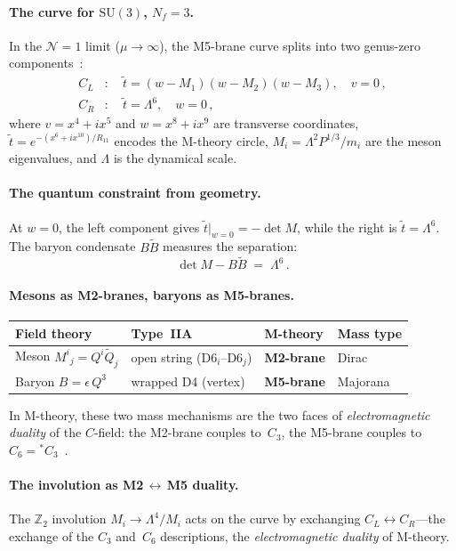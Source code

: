 \documentclass[12pt,a4paper]{article}
\newcommand{\SU}{\mathrm{SU}}
\newcommand{\Nf}{N_f}
\begin{document}
\paragraph{The curve for $\SU(3)$, $\Nf = 3$.}
In the $\mathcal{N} = 1$ limit ($\mu \to \infty$), the M5-brane
curve splits into two genus-zero components~\cite{HoriOoguriOz:1997}:
\begin{align}
  C_L &:\quad \tilde{t} = (w - M_1)(w - M_2)(w - M_3),\quad v = 0\,,
  \label{eq:CL} \\
  C_R &:\quad \tilde{t} = \Lambda^6,\quad w = 0\,,
  \label{eq:CR}
\end{align}
where $v = x^4 + ix^5$ and $w = x^8 + ix^9$ are transverse
coordinates, $\tilde{t} = e^{-(x^6 + ix^{10})/R_{11}}$ encodes the
M-theory circle, $M_i = \Lambda^2 P^{1/3}/m_i$ are the meson
eigenvalues, and $\Lambda$ is the dynamical scale.

\paragraph{The quantum constraint from geometry.}
At $w = 0$, the left component gives
$\tilde{t}\big|_{w=0} = -\det M$,
while the right is $\tilde{t} = \Lambda^6$.
The baryon condensate $B\tilde{B}$ measures the separation:
\begin{equation}
  \det M - B\tilde{B} \;=\; \Lambda^6\,.
  \label{eq:constraint_brane}
\end{equation}

\paragraph{Mesons as M2-branes, baryons as M5-branes.}
\begin{center}
\begin{tabular}{llll}
\toprule
Field theory & Type~IIA & M-theory & Mass type \\
\midrule
Meson $M^i{}_j = Q^i\tilde{Q}_j$ &
  open string (D6$_i$--D6$_j$) &
  \textbf{M2-brane} & Dirac \\
Baryon $B = \epsilon\,Q^3$ &
  wrapped D4 (vertex) &
  \textbf{M5-brane} & Majorana \\
\bottomrule
\end{tabular}
\end{center}
In M-theory, these two mass mechanisms are the two faces of
\emph{electromagnetic duality} of the $C$-field: the M2-brane
couples to~$C_3$, the M5-brane couples to
$C_6 = {}^*C_3$~\cite{Witten:1997M5}.

\paragraph{The involution as M2$\,\leftrightarrow\,$M5 duality.}
The $\mathbb{Z}_2$ involution
$M_i \to \Lambda^4/M_i$ acts on the curve by exchanging
$C_L \leftrightarrow C_R$---the exchange of the $C_3$
and~$C_6$ descriptions, the
\emph{electromagnetic duality} of M-theory.
\end{document}
